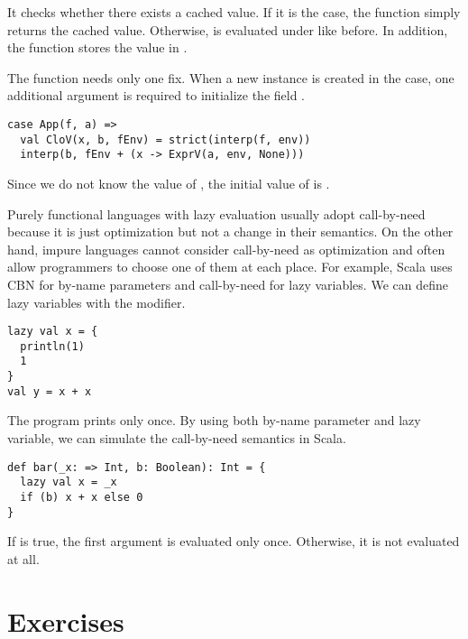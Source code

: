 It checks whether there exists a cached value. If it is the case, the function
simply returns the cached value. Otherwise,  is evaluated under
 like before. In addition, the function stores the value in .

The function  needs only one fix. When a new  instance
is created in the  case, one additional argument is required to
initialize the field .

\begin{verbatim}
case App(f, a) =>
  val CloV(x, b, fEnv) = strict(interp(f, env))
  interp(b, fEnv + (x -> ExprV(a, env, None)))
\end{verbatim}

Since we do not know the value of , the initial value of  is .

Purely functional languages with lazy evaluation usually adopt call-by-need
because it is just optimization but not a change in their semantics. On the
other hand, impure languages cannot consider call-by-need as optimization and
often allow programmers to choose one of them at each place. For example, Scala
uses CBN for by-name parameters and call-by-need for lazy variables. We can
define lazy variables with the  modifier.

\begin{verbatim}
lazy val x = {
  println(1)
  1
}
val y = x + x
\end{verbatim}

The program prints  only once. By using both by-name parameter and lazy
variable, we can simulate the call-by-need semantics in Scala.

\begin{verbatim}
def bar(_x: => Int, b: Boolean): Int = {
  lazy val x = _x
  if (b) x + x else 0
}
\end{verbatim}

If  is true, the first argument is evaluated only once. Otherwise, it is
not evaluated at all.

\section{Exercises}

